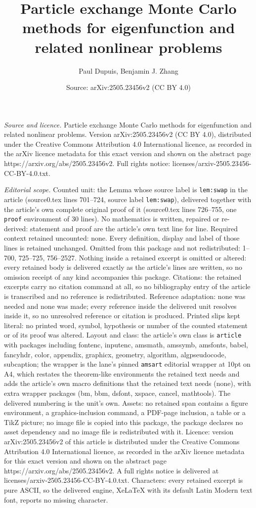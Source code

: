 \documentclass[10pt,a4paper]{amsart}
\title[Particle exchange Monte Carlo methods for eigenfunction and ]{Particle exchange Monte Carlo methods for eigenfunction and related nonlinear problems}
\author{Paul Dupuis, Benjamin J. Zhang}
\date{Source: arXiv:2505.23456v2 (CC BY 4.0)}
\begin{document}
\maketitle

\noindent\emph{Source and licence.} Particle exchange Monte Carlo methods for eigenfunction and related nonlinear problems. Version arXiv:2505.23456v2 (CC BY 4.0), distributed under the Creative Commons Attribution 4.0 International licence, as recorded in the arXiv licence metadata for this exact version and shown on the abstract page https://arxiv.org/abs/2505.23456v2. Full rights notice: licenses/arxiv-2505.23456-CC-BY-4.0.txt.\par\smallskip

\noindent\textit{Editorial scope.} Counted unit: the Lemma whose source label is \texttt{lem:swap} in the article (source0.tex lines 701--724, source label \texttt{lem:swap}), delivered together with the article's own complete original proof of it (source0.tex lines 726--755, one \texttt{proof} environment of 30 lines). No mathematics is written, repaired or re-derived: statement and proof are the article's own text line for line. Required context retained uncounted: none. Every definition, display and label of those lines is retained unchanged. Omitted from this package and not redistributed: 1--700, 725--725, 756--2527. Nothing inside a retained excerpt is omitted or altered: every retained body is delivered exactly as the article's lines are written, so no omission receipt of any kind accompanies this package. Citations: the retained excerpts carry no citation command at all, so no bibliography entry of the article is transcribed and no reference is redistributed. Reference adaptation: none was needed and none was made; every reference inside the delivered unit resolves inside it, so no unresolved reference or citation is produced. Printed slips kept literal: no printed word, symbol, hypothesis or number of the counted statement or of its proof was altered. Layout and class: the article's own class is \texttt{article} with packages including fontenc, inputenc, amsmath, amssymb, amsfonts, babel, fancyhdr, color, appendix, graphicx, geometry, algorithm, algpseudocode, subcaption; the wrapper is the lane's pinned \texttt{amsart} editorial wrapper at 10pt on A4, which restates the theorem-like environments the retained text needs and adds the article's own macro definitions that the retained text needs (none), with extra wrapper packages (bm, bbm, dsfont, xspace, cancel, mathtools). The delivered numbering is the unit's own. Assets: no retained span contains a figure environment, a graphics-inclusion command, a PDF-page inclusion, a table or a TikZ picture; no image file is copied into this package, the package declares no asset dependency and no image file is redistributed with it. Licence: version arXiv:2505.23456v2 of this article is distributed under the Creative Commons Attribution 4.0 International licence, as recorded in the arXiv licence metadata for this exact version and shown on the abstract page https://arxiv.org/abs/2505.23456v2. A full rights notice is delivered at licenses/arxiv-2505.23456-CC-BY-4.0.txt. Characters: every retained excerpt is pure ASCII, so the delivered engine, XeLaTeX with its default Latin Modern text font, reports no missing character.
\end{document}
